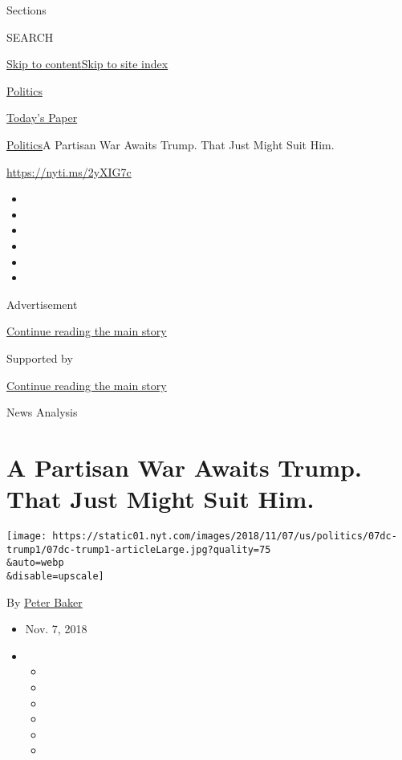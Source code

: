 Sections

SEARCH

\protect\hyperlink{site-content}{Skip to
content}\protect\hyperlink{site-index}{Skip to site index}

\href{https://www.nytimes.com/section/politics}{Politics}

\href{https://myaccount.nytimes.com/auth/login?response_type=cookie\&client_id=vi}{}

\href{https://www.nytimes.com/section/todayspaper}{Today's Paper}

\href{/section/politics}{Politics}\textbar{}A Partisan War Awaits Trump.
That Just Might Suit Him.

\url{https://nyti.ms/2yXIG7c}

\begin{itemize}
\item
\item
\item
\item
\item
\item
\end{itemize}

Advertisement

\protect\hyperlink{after-top}{Continue reading the main story}

Supported by

\protect\hyperlink{after-sponsor}{Continue reading the main story}

News Analysis

\hypertarget{a-partisan-war-awaits-trump-that-just-might-suit-him}{%
\section{A Partisan War Awaits Trump. That Just Might Suit
Him.}\label{a-partisan-war-awaits-trump-that-just-might-suit-him}}

\texttt{[image: https://static01.nyt.com/images/2018/11/07/us/politics/07dc-trump1/07dc-trump1-articleLarge.jpg?quality=75\\\&auto=webp\\\&disable=upscale]}

By \href{https://www.nytimes.com/by/peter-baker}{Peter Baker}

\begin{itemize}
\item
  Nov. 7, 2018
\item
  \begin{itemize}
  \item
  \item
  \item
  \item
  \item
  \item
  \end{itemize}
\end{itemize}

